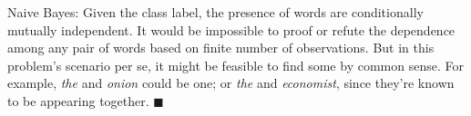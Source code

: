 \documentclass[11pt]{article}
\newcounter{marks}
\def\dumptotal{%
\begin{flushright}
\begin{tabular}{|l|} \hline
\LARGE{\textbf{\rule{0pt}{16pt}Total:~\themarks}} \\ \hline
\end{tabular}
\end{flushright}}
\begin{document}
{\color{blue} Naive Bayes: Given the class label, the presence of words are conditionally mutually independent. 
It would be impossible to proof or refute the dependence among any pair of words based on finite number of 
observations. But in this problem's scenario per se, it might be feasible to find some by common sense. 
For example, {\it the} and {\it onion} could be one; or {\it the} and {\it economist}, since they're known 
to be appearing together. {\hfill$\blacksquare$} }


\dumptotal
\end{document}
